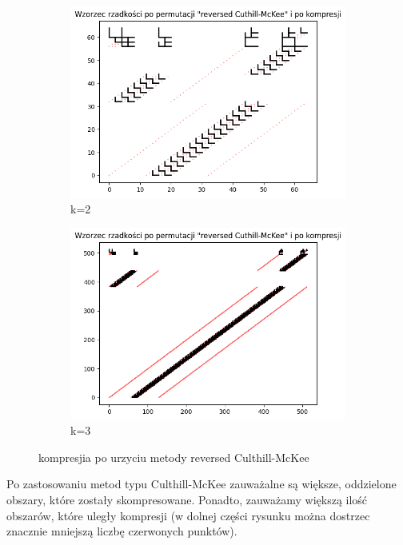 \documentclass{article}
\begin{document}
\FloatBarrier
\begin{figure}[htbp]
  \centering
  \begin{subfigure}[b]{0.4\textwidth}
      \includegraphics[width=\linewidth]{img/2d3k2.png}
      \caption{k=2}
      \label{fig:obraz1}
  \end{subfigure}
  \hfill
  \begin{subfigure}[b]{0.4\textwidth}
      \includegraphics[width=\linewidth]{img/2d3k3.png}
      \caption{k=3}
      \label{fig:obraz2}
  \end{subfigure}
  \caption{kompresjia po urzyciu metody reversed Culthill-McKee}
  \label{fig:zestaw_obrazkow}
\end{figure}

Po zastosowaniu metod typu Culthill-McKee zauważalne są większe, oddzielone obszary, które zostały skompresowane. Ponadto, zauważamy większą ilość obszarów, które uległy kompresji (w dolnej części rysunku można dostrzec znacznie mniejszą liczbę czerwonych punktów).
\FloatBarrier
\end{document}
